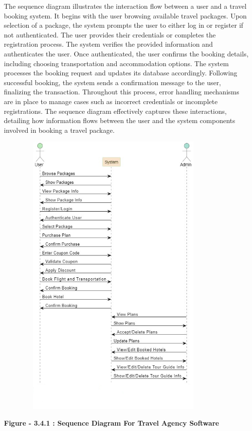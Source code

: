 \documentclass{scrreprt}
\begin{document}
The sequence diagram illustrates the interaction flow between a user and a travel booking system. It begins with the user browsing available travel packages. Upon selection of a package, the system prompts the user to either log in or register if not authenticated. The user provides their credentials or completes the registration process. The system verifies the provided information and authenticates the user. Once authenticated, the user confirms the booking details, including choosing transportation and accommodation options. The system processes the booking request and updates its database accordingly. Following successful booking, the system sends a confirmation message to the user, finalizing the transaction. Throughout this process, error handling mechanisms are in place to manage cases such as incorrect credentials or incomplete registrations. The sequence diagram effectively captures these interactions, detailing how information flows between the user and the system components involved in booking a travel package.

{\includegraphics[width=450px, height=550px]{sqd.jpg}}

\begin{center}
    \parbox{0.8\textwidth}{ 
        \centering
        \textbf{Figure - 3.4.1 : Sequence Diagram For Travel Agency Software}
    }
\end{center}
\end{document}
